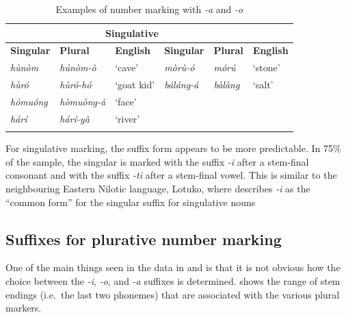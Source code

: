 \documentclass[output=paper]{langsci/langscibook}
\begin{document}
\begin{table}
\begin{tabularx}{\textwidth}{XlXXXX}
\lsptoprule

\multicolumn{3}{c}{ \textbf{Plural}} & \multicolumn{3}{c}{ \textbf{Singulative}}\\ \midrule
 \textbf{Singular} & \textbf{Plural} & \textbf{English} & \textbf{Singular} & \textbf{Plural} & \textbf{English}\\ \midrule
\itshape h\`{u}n\`{o}m & \itshape h\'{u}n\`{o}m-\`{o} & ‘cave’ & \itshape m\`{o}r\`{u}-\'{o} & \itshape m\'{o}r\'{u} & ‘stone’\\
\itshape h\`{u}r\'{o} & \itshape h\`{u}r\'{o}-h\'{o} & ‘goat kid’ & \itshape b\'{a}l\'{a}ng-\'{a} & \itshape b\`{a}l\`{a}ng & ‘salt’\\
\itshape h\'{o}mu\'{o}ng & \itshape h\`{o}mu\`{o}ng-\^{a} & ‘face’ &  &  & \\
\itshape h\'{a}r\'{i} & \itshape h\'{a}r\'{i}-y\`{a} & ‘river’ &  &  & \\
\lspbottomrule
\end{tabularx}
\caption{Examples of number marking with \textit{-a} and \textit{-o}} 
\label{tab:moodie:11}
\end{table}

For singulative marking, the suffix form appears to be more predictable.  In 75\% of the sample, the singular is marked with the suffix \textit{-i} after a stem-final consonant and with the suffix \textit{-ti} after a stem-final vowel. This is similar to the neighbouring Eastern Nilotic language, Lotuko, where \citet[7]{Arber1936} describes \textit{-i} as the “common form” for the singular suffix for singulative nouns 

\subsection{Suffixes for plurative number marking}\label{sec:moodie:4.2} 

One of the main things seen in the data in  and  is that it is not obvious how the choice between the \textit{{}-i}, \textit{-o}, and \textit{{}-a} suffixes is determined.  shows the range of stem endings (i.e.\ the last two phonemes) that are associated with the various plural markers.
\end{document}
